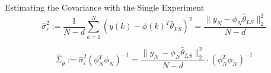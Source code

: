 \begin{tcolorbox}[colback=red!5!white,colframe=red!75!black,title=Example LLS]
Estimating the Covariance with the Single Experiment
\begin{equation*}
\hat { \sigma  } _{ \varepsilon  }^{ 2 } := \frac { 1 }{ N-d } \sum _{ k=1 }^{ N }{ (y(k)-\phi (k)^{ T }\hat { \theta  } _{ LS })^{ 2 } }  = \frac { \parallel y_{ N }-\phi _{ N }\hat { \theta  } _{ LS }{ \parallel  }_{ 2 }^{ 2 } }{ N-d } 
\end{equation*}

\begin{equation*}
\hat { \Sigma  } _{ \hat { \theta  }  } := \hat { \sigma  } ^{ 2 }_{ \varepsilon  } (\phi ^{ T }_{ N } \phi _{ N })^{ -1 } = \frac { \parallel y_{ N }\, -\phi _{ N }\hat { \theta  } _{ LS }{ \parallel  }_{ 2 }^{ 2 } }{ N-d } \cdot (\phi ^{ T }_{ N } \phi _{ N })^{ -1 }
\end{equation*}
\end{tcolorbox}
